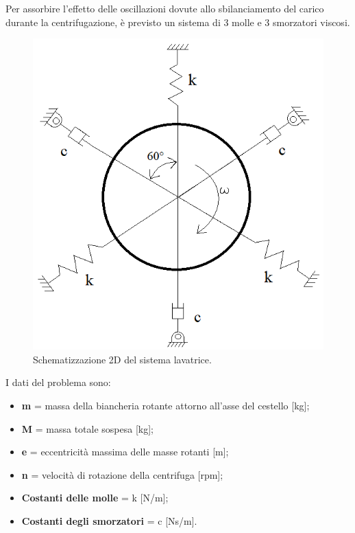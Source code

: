 Per assorbire l'effetto delle oscillazioni dovute allo sbilanciamento del carico durante la centrifugazione, è previsto un sistema di 3 molle e 3 smorzatori viscosi.
\begin{figure}[h]
    \centering
    \includegraphics[scale=0.63]{Immagini/Lavatrice3Smorz3Molle.png}
    \caption{Schematizzazione 2D del sistema lavatrice.}
    \label{Modello2D}
\end{figure}

I dati del problema sono:
\begin{itemize}
    \item \textbf{m} = massa della biancheria rotante attorno all'asse del cestello [kg];
    \item \textbf{M} = massa totale sospesa [kg];
    \item \textbf{e} = eccentricità massima delle masse rotanti [m];
    \item \textbf{n} = velocità di rotazione della centrifuga [rpm];
    \item \textbf{Costanti delle molle} = k [N/m];
    \item \textbf{Costanti degli smorzatori} = c [Ns/m].
\end{itemize}


